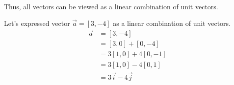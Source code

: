 Thus, all vectors can be viewed as a linear combination of unit vectors. 

\begin{example}
    Let's expressed vector $\vec{a} = \left[3, -4\right]$ as a linear combination of unit vectors. 
    \begin{align*}
        \vec{a} &= \left[3, -4\right] \\
        &= \left[3, 0\right] + \left[0, -4\right]\\
        &= 3\left[1, 0\right] + 4\left[0, -1\right] \\
        &= 3\left[1, 0\right] - 4\left[0, 1\right] \\
        &= 3\vec{i} - 4\vec{j}
    \end{align*}
\end{example}

\newpage